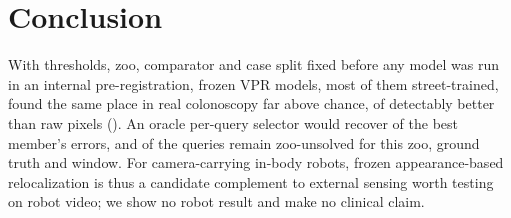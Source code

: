 \section{Conclusion}
\label{sec:conclusion}

With thresholds, zoo, comparator and case split fixed before any model was
run in an internal pre-registration, frozen VPR models, most of them
street-trained, found the same place in real colonoscopy far above chance,
 of  detectably better than raw pixels
(\texttt{}). An oracle per-query selector would recover
 of the best member's errors, and  of the queries remain zoo-unsolved for this zoo,
ground truth and window. For camera-carrying in-body robots, frozen
appearance-based relocalization is thus a candidate complement to external
sensing worth testing on robot video; we show no robot result and make no
clinical claim.
